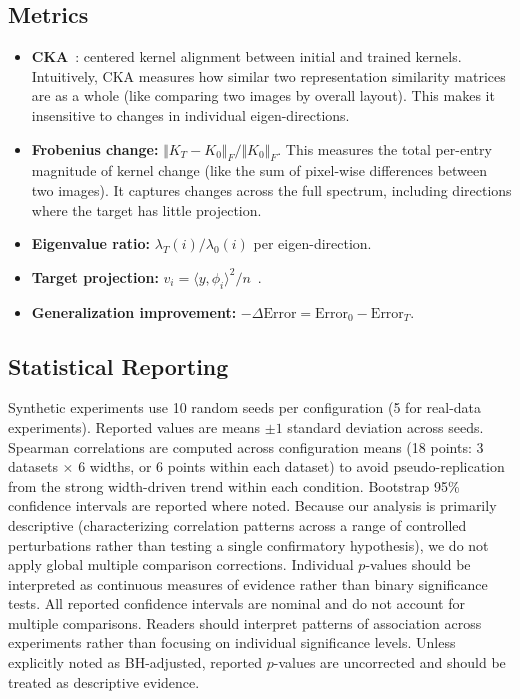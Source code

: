 \documentclass[twoside,11pt]{article}
\newcommand{\DK}{{\Vert K_{T}-K_{0}\Vert_{F}/\Vert K_{0}\Vert_{F}}}
\begin{document}
\subsection{Metrics}
\begin{itemize}
    \item \textbf{CKA}~\citep{kornblith2019similarity}: centered kernel alignment between initial and trained kernels. Intuitively, CKA measures how similar two representation similarity matrices are as a whole (like comparing two images by overall layout). This makes it insensitive to changes in individual eigen-directions.
    \item \textbf{Frobenius change:} $\DK$. This measures the total per-entry magnitude of kernel change (like the sum of pixel-wise differences between two images). It captures changes across the full spectrum, including directions where the target has little projection.
    \item \textbf{Eigenvalue ratio:} $\lambda_{T}(i)/\lambda_{0}(i)$ per eigen-direction.
    \item \textbf{Target projection:} $v_{i}=\langle y,\phi_{i}\rangle^{2}/n$~\citep{canatar2021spectral}.
    \item \textbf{Generalization improvement:} $-\Delta\text{Error}=\text{Error}_{0}-\text{Error}_{T}$.
\end{itemize}

\subsection{Statistical Reporting}
Synthetic experiments use 10 random seeds per configuration (5 for real-data experiments).  Reported values are means $\pm 1$ standard deviation across seeds.  Spearman correlations are computed across configuration means (18 points: 3 datasets $\times$ 6 widths, or 6 points within each dataset) to avoid pseudo-replication from the strong width-driven trend within each condition.  Bootstrap 95\% confidence intervals are reported where noted.  Because our analysis is primarily descriptive (characterizing correlation patterns across a range of controlled perturbations rather than testing a single confirmatory hypothesis), we do not apply global multiple comparison corrections. Individual $p$-values should be interpreted as continuous measures of evidence rather than binary significance tests. All reported confidence intervals are nominal and do not account for multiple comparisons. Readers should interpret patterns of association across experiments rather than focusing on individual significance levels.  Unless explicitly noted as BH-adjusted, reported $p$-values are uncorrected and should be treated as descriptive evidence.
\end{document}

